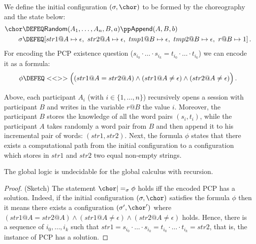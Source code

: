 \begin{definition}
  We define the initial configuration $(\sigma,\chor)$ to be formed by
  the choreography and the state below:
  {\small
  \begin{align*}
    \chor & \DEFEQ
    \textsf{Random}(A_1,\dots,A_n,B,a) \pp  \textsf{Append}(A,B,b) \\
    \sigma & \DEFEQ
    [str1@A \mapsto \epsilon,\ str2@A \mapsto \epsilon,\
    tmp1@B \mapsto \epsilon,\ tmp2@B \mapsto \epsilon,\
    r@B \mapsto 1] \, .
  \end{align*}
  }
  For encoding the PCP existence question ($s_{i_0}\cdot \ldots \cdot
  s_{i_k} = t_{i_0}\cdot \ldots \cdot t_{i_k}$) we can encode it as a
  \GL formula:
  {\small
  \begin{equation*}
    \phi \DEFEQ
    <<>> \Big(
    (str1@A = str2@A) \land
    (str1@A \neq \epsilon) \land
    (str2@A \neq \epsilon)
    \Big) \, .
  \end{equation*}
  }
\end{definition}
\NI Above, each participant $A_i$ (with $i\in \{1,\dots,n\}$)
recursively opens a session with participant $B$ and writes in the
variable $r@B$ the value $i$. Moreover, the participant $B$ stores the
knowledge of all the word pairs $(s_i,t_i)$, while the participant $A$
takes randomly a word pair from $B$ and then append it to his
incremental pair of words: $(str1,str2)$.  Next, the formula $\phi$
states that there exists a computational path from the initial
configuration to a configuration which stores in $str1$ and $str2$ two
equal non-empty strings.

\begin{theorem}
  The global logic is undecidable for the global calculus with
  recursion.
\end{theorem}
\begin{proof} 
  (Sketch) The statement $\chor |=_\sigma \phi$ holds iff the encoded
  PCP has a solution.  Indeed, if the initial configuration
  $(\sigma,\chor)$ satisfies the formula $\phi$ then it means there
  exists a configuration $(\sigma',\chor')$ where $(str1@A = str2@A)
  \land (str1@A \neq \epsilon) \land (str2@A \neq \epsilon)$
  holds. Hence, there is a sequence of $i_0,\dots,i_k$ such that $str1
  = s_{i_0}\cdot \ldots \cdot s_{i_k} = t_{i_0}\cdot \ldots \cdot
  t_{i_k} = str2$, that is, the instance of PCP has a solution.
\end{proof}


